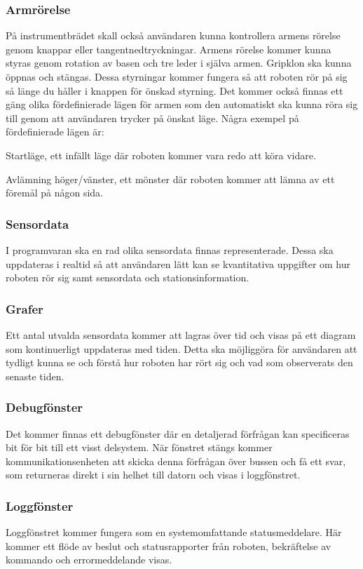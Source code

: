 \subsubsection{Armrörelse}
På instrumentbrädet skall också användaren kunna kontrollera armens rörelse genom knappar eller tangentnedtryckningar. Armens rörelse kommer kunna styras genom rotation av basen och tre leder i själva armen. Gripklon ska kunna öppnas och stängas. Dessa styrningar kommer fungera så att roboten rör på sig så länge du håller i knappen för önskad styrning. Det kommer också finnas ett gäng olika fördefinierade lägen för armen som den automatiskt ska kunna röra sig till genom att användaren trycker på önskat läge. Några exempel på fördefinierade lägen är:

\begin{packed_itemize}
\item Startläge, ett infällt läge där roboten kommer vara redo att köra vidare.
\item Avlämning höger/vänster, ett mönster där roboten kommer att lämna av ett föremål på någon sida.
\end{packed_itemize}

\subsubsection{Sensordata}
I programvaran ska en rad olika sensordata finnas representerade. Dessa ska uppdateras i realtid så att användaren lätt kan se kvantitativa uppgifter om hur roboten rör sig samt sensordata och stationsinformation. 

\subsubsection{Grafer}
Ett antal utvalda sensordata kommer att lagras över tid och visas på ett diagram som kontinuerligt uppdateras med tiden. Detta ska möjliggöra för användaren att tydligt kunna se och förstå hur roboten har rört sig och vad som observerats den senaste tiden. 

\subsubsection{Debugfönster}
Det kommer finnas ett debugfönster där en detaljerad förfrågan kan specificeras bit för bit till ett visst delsystem. När fönstret stängs kommer kommunikationsenheten att skicka denna förfrågan över bussen och få ett svar, som returneras direkt i sin helhet till datorn och visas i loggfönstret.

\subsubsection{Loggfönster}
Loggfönstret kommer fungera som en systemomfattande statusmeddelare. Här kommer ett flöde av beslut och statusrapporter från roboten, bekräftelse av kommando och errormeddelande visas.



